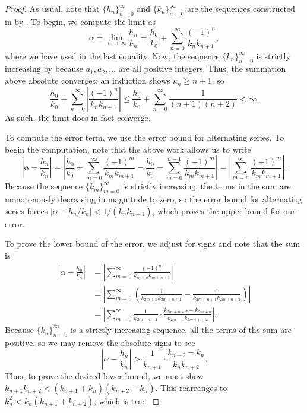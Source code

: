 \documentclass[../notes.tex]{subfiles}
\begin{document}
\begin{proof}
	As usual, note that $\{h_n\}_{n=0}^\infty$ and $\{k_n\}_{n=0}^\infty$ are the sequences constructed in  by . To begin, we compute the limit as
	\[\alpha=\lim_{n\to\infty}\frac{h_n}{k_n} = \frac{h_0}{k_0}+\sum_{n=0}^\infty\frac{(-1)^{n}}{k_nk_{n+1}},\]
	where we have used  in the last equality. Now, the sequence $\{k_n\}_{n=0}^\infty$ is strictly increasing by  because $a_1,a_2,\ldots$ are all positive integers. Thus, the summation above absolute converges: an induction shows $k_n\ge n+1$, so
	\[\frac{h_0}{k_0}+\sum_{n=0}^\infty\left|\frac{(-1)^{n}}{k_nk_{n+1}}\right|\le\frac{h_0}{k_0}+\sum_{n=0}^\infty\frac1{(n+1)(n+2)}<\infty.\]
	As such, the limit does in fact converge.

	To compute the error term, we use the error bound for alternating series. To begin the computation, note that the above work allows us to write
	\[\left|\alpha-\frac{h_n}{k_n}\right| = \left|\frac{h_0}{k_0}+\sum_{m=0}^\infty\frac{(-1)^{m}}{k_mk_{m+1}}-\frac{h_0}{k_0}-\sum_{m=0}^{n-1}\frac{(-1)^{m}}{k_mk_{m+1}}\right| = \left|\sum_{m=n}^\infty\frac{(-1)^{m}}{k_mk_{m+1}}\right|.\]
	Because the sequence $\{k_m\}_{m=0}^\infty$ is strictly increasing, the terms in the sum are monotonously decreasing in magnitude to zero, so the error bound for alternating series forces $\left|\alpha-h_n/k_n\right|<1/(k_nk_{n+1})$, which proves the upper bound for our error.

	To prove the lower bound of the error, we adjust for signs and note that the sum is
	\begin{align*}
		\left|\alpha-\frac{h_n}{k_n}\right| &= \left|\sum_{m=0}^\infty\frac{(-1)^{m}}{k_{m+n}k_{m+n+1}}\right| \\
		&= \left|\sum_{m=0}^\infty\left(\frac1{k_{2m+n}k_{2m+n+1}}-\frac1{k_{2m
		+n+1}k_{2m+n+2}}\right)\right| \\
		&= \left|\sum_{m=0}^\infty\frac1{k_{2m+n+1}}\cdot\frac{k_{2m+n+2}-k_{2m+n}}{k_{2m+n}k_{2m+n+2}}\right|.
	\end{align*}
	Because $\{k_n\}_{n=0}^\infty$ is a strictly increasing sequence, all the terms of the sum are positive, so we may remove the absolute signs to see
	\[\left|\alpha-\frac{h_n}{k_n}\right|>\frac1{k_{n+1}}\cdot\frac{k_{n+2}-k_{n}}{k_{n}k_{n+2}}.\]
	Thus, to prove the desired lower bound, we must show $k_{n+1}k_{n+2}<(k_{n+1}+k_n)(k_{n+2}-k_n)$. This rearranges to $k_n^2<k_n(k_{n+1}+k_{n+2})$, which is true.
\end{proof}
\end{document}
